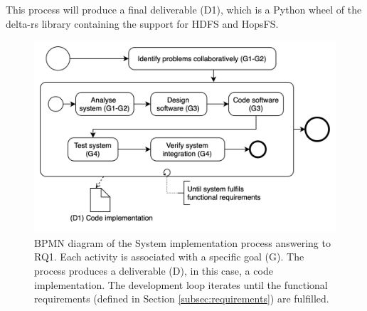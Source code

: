 This process will produce a final deliverable (D1), which is a Python wheel of the delta-rs library containing the support for \gls{HDFS} and \gls{HopsFS}.

\begin{figure}[!ht]
    \begin{center}
      \includegraphics[width=\textwidth]{figures/3-method/research_process_rq1.png}
    \caption[System implementation process]{\gls{BPMN} diagram of the System implementation process answering to RQ1. Each activity is associated with a specific goal (\gls{G}). The process produces a deliverable (\gls{D}), in this case, a code implementation. The development loop iterates until the functional requirements (defined in Section \ref{subsec:requirements}) are fulfilled.}
    \label{fig:DevProcessRQ1}
    \end{center}
\end{figure}

